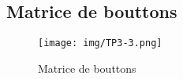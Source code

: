 \subsection{Matrice de bouttons}


\begin{figure}[H]
	\centering
	\texttt{[image: img/TP3-3.png]}
	\caption{\label{TP3.3}Matrice de bouttons}
\end{figure}


% 
